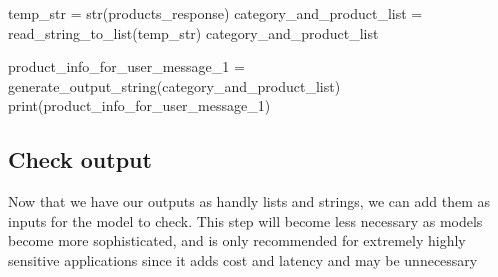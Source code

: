 \documentclass[
  letterpaper,
  DIV=11,
  numbers=noendperiod]{scrreprt}
\newenvironment{Shaded}{\begin{snugshade}}{\end{snugshade}}
\newcommand{\BuiltInTok}[1]{\textcolor[rgb]{0.00,0.23,0.31}{#1}}
\newcommand{\NormalTok}[1]{\textcolor[rgb]{0.00,0.23,0.31}{#1}}
\newcommand{\OperatorTok}[1]{\textcolor[rgb]{0.37,0.37,0.37}{#1}}
\begin{document}
\begin{Shaded}
\begin{Highlighting}[]
\NormalTok{temp\_str }\OperatorTok{=} \BuiltInTok{str}\NormalTok{(products\_response)}
\NormalTok{category\_and\_product\_list }\OperatorTok{=}\NormalTok{ read\_string\_to\_list(temp\_str)}
\NormalTok{category\_and\_product\_list}
\end{Highlighting}
\end{Shaded}

\begin{Shaded}
\begin{Highlighting}[]
\NormalTok{product\_info\_for\_user\_message\_1 }\OperatorTok{=}\NormalTok{ generate\_output\_string(category\_and\_product\_list)}
\BuiltInTok{print}\NormalTok{(product\_info\_for\_user\_message\_1)}
\end{Highlighting}
\end{Shaded}

\hypertarget{check-output-1}{%
\subsection{Check output}\label{check-output-1}}

Now that we have our outputs as handly lists and strings, we can add
them as inputs for the model to check. This step will become less
necessary as models become more sophisticated, and is only recommended
for extremely highly sensitive applications since it adds cost and
latency and may be unnecessary
\end{document}
